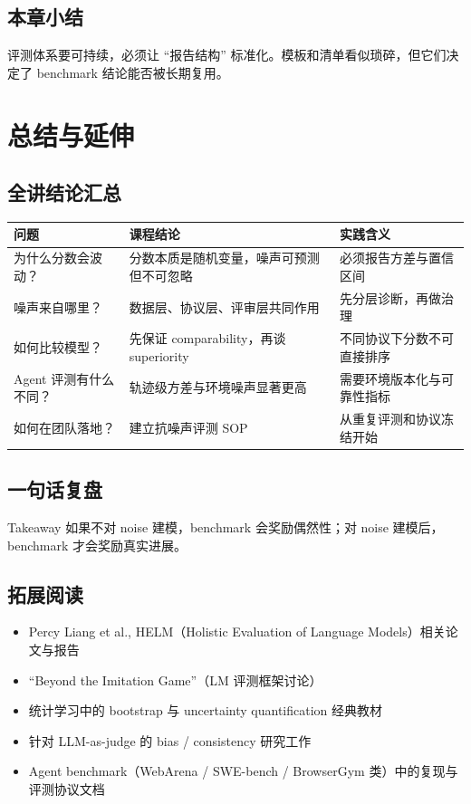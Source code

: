 \documentclass[a4paper]{article}
\begin{document}
\subsection{本章小结}
评测体系要可持续，必须让 ``报告结构'' 标准化。模板和清单看似琐碎，但它们决定了 benchmark 结论能否被长期复用。

\section{总结与延伸}

\subsection{全讲结论汇总}
\begin{longtable}{p{3.0cm}p{3.8cm}p{4.4cm}}
\toprule
\textbf{问题} & \textbf{课程结论} & \textbf{实践含义} \\
\midrule
为什么分数会波动？ & 分数本质是随机变量，噪声可预测但不可忽略 & 必须报告方差与置信区间 \\
噪声来自哪里？ & 数据层、协议层、评审层共同作用 & 先分层诊断，再做治理 \\
如何比较模型？ & 先保证 comparability，再谈 superiority & 不同协议下分数不可直接排序 \\
Agent 评测有什么不同？ & 轨迹级方差与环境噪声显著更高 & 需要环境版本化与可靠性指标 \\
如何在团队落地？ & 建立抗噪声评测 SOP & 从重复评测和协议冻结开始 \\
\bottomrule
\end{longtable}

\subsection{一句话复盘}
\begin{importantbox}{Takeaway}
如果不对 noise 建模，benchmark 会奖励偶然性；对 noise 建模后，benchmark 才会奖励真实进展。
\end{importantbox}

\subsection{拓展阅读}
\begin{itemize}
    \item Percy Liang et al., HELM（Holistic Evaluation of Language Models）相关论文与报告
    \item ``Beyond the Imitation Game''（LM 评测框架讨论）
    \item 统计学习中的 bootstrap 与 uncertainty quantification 经典教材
    \item 针对 LLM-as-judge 的 bias / consistency 研究工作
    \item Agent benchmark（WebArena / SWE-bench / BrowserGym 类）中的复现与评测协议文档
\end{itemize}
\end{document}
